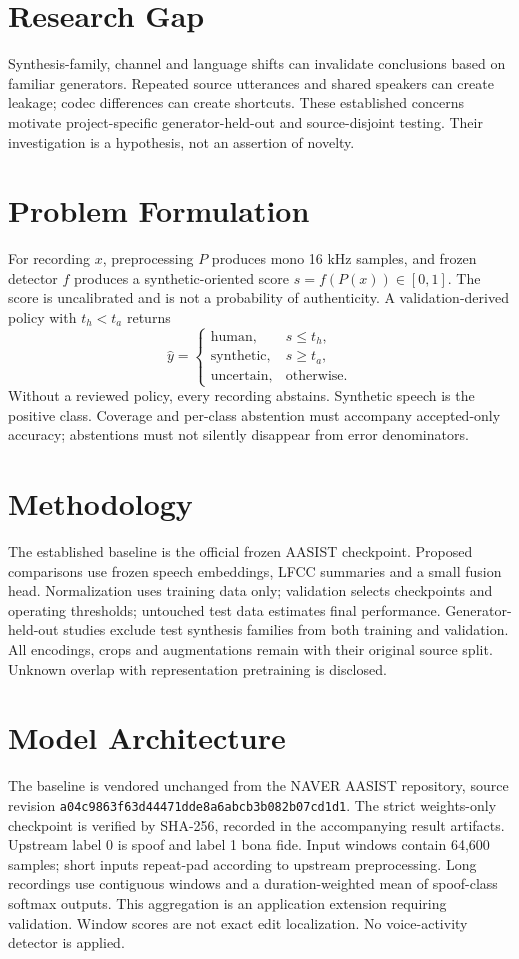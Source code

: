 \IfFileExists{IEEEtran.cls}{\documentclass[conference]{IEEEtran}}{\documentclass[10pt,twocolumn]{article}\usepackage[margin=0.75in]{geometry}}
\begin{document}
\section{Research Gap}
Synthesis-family, channel and language shifts can invalidate conclusions based on familiar generators. Repeated source utterances and shared speakers can create leakage; codec differences can create shortcuts. These established concerns motivate project-specific generator-held-out and source-disjoint testing. Their investigation is a hypothesis, not an assertion of novelty.

\section{Problem Formulation}
For recording $x$, preprocessing $P$ produces mono 16 kHz samples, and frozen detector $f$ produces a synthetic-oriented score $s=f(P(x))\in[0,1]$. The score is uncalibrated and is not a probability of authenticity. A validation-derived policy with $t_h<t_a$ returns
\begin{equation}
\hat y=\begin{cases}\mathrm{human},&s\le t_h,\\\mathrm{synthetic},&s\ge t_a,\\\mathrm{uncertain},&\text{otherwise}.\end{cases}
\end{equation}
Without a reviewed policy, every recording abstains. Synthetic speech is the positive class. Coverage and per-class abstention must accompany accepted-only accuracy; abstentions must not silently disappear from error denominators.

\section{Methodology}
The established baseline is the official frozen AASIST checkpoint. Proposed comparisons use frozen speech embeddings, LFCC summaries and a small fusion head. Normalization uses training data only; validation selects checkpoints and operating thresholds; untouched test data estimates final performance. Generator-held-out studies exclude test synthesis families from both training and validation. All encodings, crops and augmentations remain with their original source split. Unknown overlap with representation pretraining is disclosed.

\section{Model Architecture}
The baseline is vendored unchanged from the NAVER AASIST repository, source revision \texttt{a04c9863f63d44471dde8a6abcb3b082b07cd1d1}. The strict weights-only checkpoint is verified by SHA-256, recorded in the accompanying result artifacts. Upstream label 0 is spoof and label 1 bona fide. Input windows contain 64,600 samples; short inputs repeat-pad according to upstream preprocessing. Long recordings use contiguous windows and a duration-weighted mean of spoof-class softmax outputs. This aggregation is an application extension requiring validation. Window scores are not exact edit localization. No voice-activity detector is applied.
\end{document}
